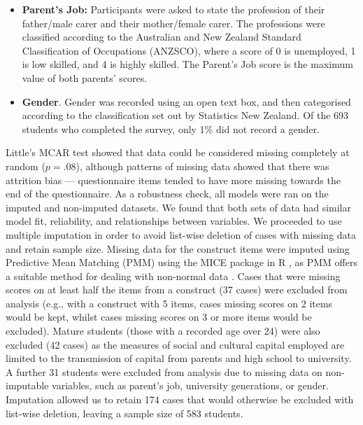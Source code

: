 \begin{itemize}
    \item \textbf{Parent's Job:} Participants were asked to state the profession of their father/male carer and their mother/female carer. The professions were classified according to the Australian and New Zealand Standard Classification of Occupations (ANZSCO), where a score of 0 is unemployed, 1 is low skilled, and 4 is highly skilled. The Parent's Job score is the maximum value of both parents' scores.
    \item \textbf{Gender}. Gender was recorded using an open text box, and then categorised according to the classification set out by Statistics New Zealand. Of the 693 students who completed the survey, only 1\% did not record a gender. 

\end{itemize}

Little's MCAR test showed that data could be considered missing completely at random ($p = .08$), although patterns of missing data showed that there was attrition bias --- questionnaire items tended to have more missing towards the end of the questionnaire. As a robustness check, all models were ran on the imputed and non-imputed datasets. We found that both sets of data had similar model fit, reliability, and relationships between variables. We proceeded to use multiple imputation in order to avoid list-wise deletion of cases with missing data and retain sample size. Missing data for the construct items were imputed using Predictive Mean Matching (PMM) using the MICE package in R \citep{buuren2010mice}, as PMM offers a suitable method for dealing with non-normal data \citep{little1988missing}. Cases that were missing scores on at least half the items from a construct (37 cases) were excluded from analysis (e.g., with a construct with 5 items, cases missing scores on 2 items would be kept, whilst cases missing scores on 3 or more items would be excluded). Mature students (those with a recorded age over 24) were also excluded (42 cases) as the measures of social and cultural capital employed are limited to the transmission of capital from parents and high school to university. A further 31 students were excluded from analysis due to missing data on non-imputable variables, such as parent's job, university generations, or gender. Imputation allowed us to retain 174 cases that would otherwise be excluded with list-wise deletion, leaving a  sample size of 583 students. 

